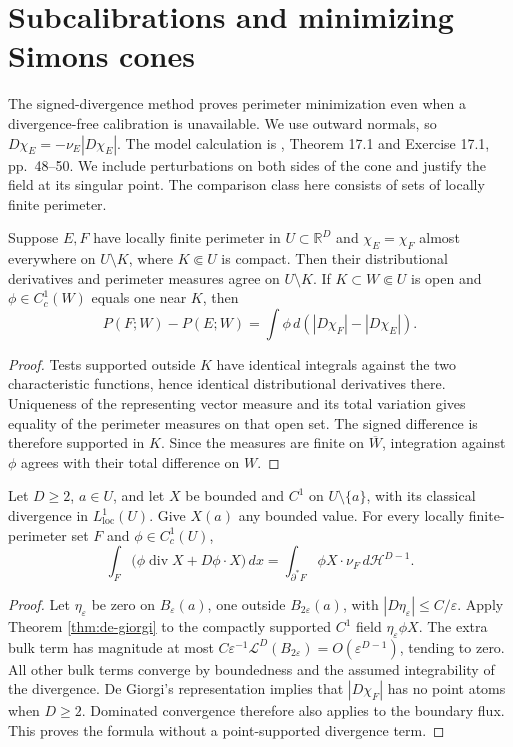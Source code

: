 \chapter{Subcalibrations and minimizing Simons cones}\label{sec:subcalibrations-simons}
The signed-divergence method proves perimeter minimization even when a divergence-free calibration is unavailable. We use outward normals, so $D\chi_E=-\nu_E|D\chi_E|$. The model calculation is \cite{ChMin}, Theorem 17.1 and Exercise 17.1, pp.~48--50. We include perturbations on both sides of the cone and justify the field at its singular point. The comparison class here consists of sets of locally finite perimeter.

\begin{lemma}\label{lem:perimeter-perturbation-locality}
Suppose $E,F$ have locally finite perimeter in $U\subset\mathbb R^D$ and $\chi_E=\chi_F$ almost everywhere on $U\setminus K$, where $K\Subset U$ is compact. Then their distributional derivatives and perimeter measures agree on $U\setminus K$. If $K\subset W\Subset U$ is open and $\phi\in C_c^1(W)$ equals one near $K$, then
\[
 P(F;W)-P(E;W)=\int\phi\,d(|D\chi_F|-|D\chi_E|).
\]
\end{lemma}
\begin{proof}
Tests supported outside $K$ have identical integrals against the two characteristic functions, hence identical distributional derivatives there. Uniqueness of the representing vector measure and its total variation gives equality of the perimeter measures on that open set. The signed difference is therefore supported in $K$. Since the measures are finite on $\overline W$, integration against $\phi$ agrees with their total difference on $W$.
\end{proof}

\begin{lemma}\label{lem:singular-field-flux}
Let $D\geq2$, $a\in U$, and let $X$ be bounded and $C^1$ on $U\setminus\{a\}$, with its classical divergence in $L^1_{\mathrm{loc}}(U)$. Give $X(a)$ any bounded value. For every locally finite-perimeter set $F$ and $\phi\in C_c^1(U)$,
\[
 \int_F\bigl(\phi\operatorname{div}X+D\phi\cdot X\bigr)\,dx
 =\int_{\partial^*F}\phi X\cdot\nu_F\,d\mathcal H^{D-1}.
\]
\end{lemma}
\begin{proof}
Let $\eta_\varepsilon$ be zero on $B_\varepsilon(a)$, one outside $B_{2\varepsilon}(a)$, with $|D\eta_\varepsilon|\leq C/\varepsilon$. Apply Theorem \ref{thm:de-giorgi} to the compactly supported $C^1$ field $\eta_\varepsilon\phi X$. The extra bulk term has magnitude at most $C\varepsilon^{-1}\mathcal L^D(B_{2\varepsilon})=O(\varepsilon^{D-1})$, tending to zero. All other bulk terms converge by boundedness and the assumed integrability of the divergence. De Giorgi's representation implies that $|D\chi_F|$ has no point atoms when $D\geq2$. Dominated convergence therefore also applies to the boundary flux. This proves the formula without a point-supported divergence term.
\end{proof}

